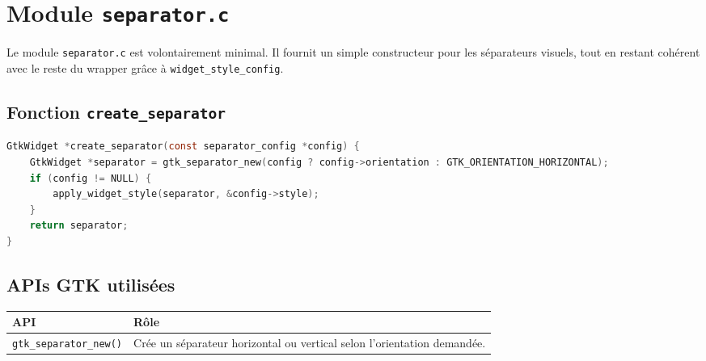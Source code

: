 \section{Module \texttt{separator.c}}

Le module \texttt{separator.c} est volontairement minimal. Il fournit un simple constructeur pour les séparateurs visuels, tout en restant cohérent avec le reste du wrapper grâce à \texttt{widget\_style\_config}.

\subsection{Fonction \texttt{create\_separator}}

\begin{lstlisting}[language=C]
GtkWidget *create_separator(const separator_config *config) {
    GtkWidget *separator = gtk_separator_new(config ? config->orientation : GTK_ORIENTATION_HORIZONTAL);
    if (config != NULL) {
        apply_widget_style(separator, &config->style);
    }
    return separator;
}
\end{lstlisting}

\subsection{APIs GTK utilisées}

\begin{center}
\begin{tabular}{|l|p{8cm}|}
\hline
\textbf{API} & \textbf{Rôle} \\
\hline
\texttt{gtk\_separator\_new()} & Crée un séparateur horizontal ou vertical selon l'orientation demandée. \\
\hline
\end{tabular}
\end{center}

\newpage
